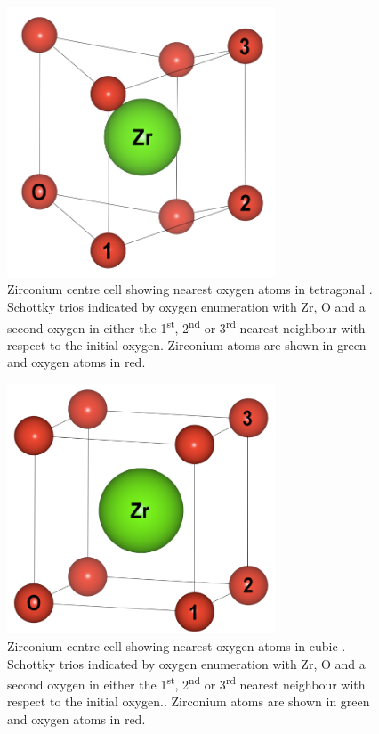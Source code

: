 \begin{figure}[ht] %
\centering
\includegraphics[width=8cm]{images/zr_centre_tet.png}
\caption{Zirconium centre  cell showing nearest oxygen atoms in tetragonal \zirconia. Schottky trios indicated by oxygen enumeration with Zr, O and a second oxygen in either the 1\textsuperscript{st}, 2\textsuperscript{nd} or 3\textsuperscript{rd} nearest neighbour with respect to the initial oxygen. Zirconium atoms are shown in green and oxygen atoms in red.}
\label{figure:tetschottky}
\end{figure}

\begin{figure}[ht] %
\centering
\includegraphics[width=8cm]{images/sd_cubic_zro2.png}
\caption{Zirconium centre cell showing nearest oxygen atoms in cubic \zirconia. Schottky trios indicated by oxygen enumeration with Zr, O and a second oxygen in either the 1\textsuperscript{st}, 2\textsuperscript{nd} or 3\textsuperscript{rd} nearest neighbour with respect to the initial oxygen.. Zirconium atoms are shown in green and oxygen atoms in red.}
\label{figure:cubicschottky}
\end{figure}

